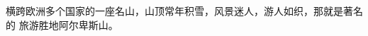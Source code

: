 \documentclass{ctexart}
\begin{document}
横跨欧洲多个国家的一座名山，山顶常年积雪，风景迷人，游人如织，那就是著名的%
\mbox{旅游胜地阿尔卑斯山。}
\end{document}
